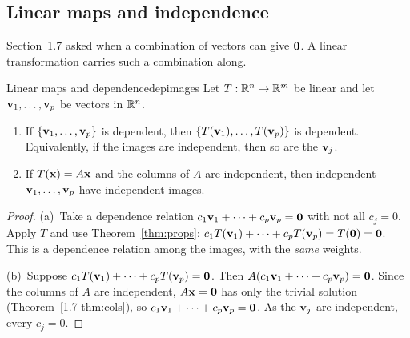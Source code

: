 \documentclass[11pt]{article}
\begin{document}
\subsection*{Linear maps and independence}

Section~1.7 asked when a combination of vectors can give $\mathbf{0}$. A linear transformation carries such a combination along.

\begin{thm}{Linear maps and dependence}{depimages}
Let $T:\mathbb{R}^n\to\mathbb{R}^m$ be linear and let $\mathbf{v}_1,\dots,\mathbf{v}_p$ be vectors in $\mathbb{R}^n$.
\begin{enumerate}[label=(\alph*),itemsep=1pt]
  \item If $\{\mathbf{v}_1,\dots,\mathbf{v}_p\}$ is dependent, then $\{T(\mathbf{v}_1),\dots,T(\mathbf{v}_p)\}$ is dependent. Equivalently, if the images are independent, then so are the $\mathbf{v}_j$.
  \item If $T(\mathbf{x})=A\mathbf{x}$ and the columns of $A$ are independent, then independent $\mathbf{v}_1,\dots,\mathbf{v}_p$ have independent images.
\end{enumerate}
\end{thm}

\begin{proof}
(a)~Take a dependence relation $c_1\mathbf{v}_1+\cdots+c_p\mathbf{v}_p=\mathbf{0}$ with not all $c_j=0$. Apply $T$ and use Theorem~\ref{thm:props}: $c_1T(\mathbf{v}_1)+\cdots+c_pT(\mathbf{v}_p)=T(\mathbf{0})=\mathbf{0}$. This is a dependence relation among the images, with the \emph{same} weights.

(b)~Suppose $c_1T(\mathbf{v}_1)+\cdots+c_pT(\mathbf{v}_p)=\mathbf{0}$. Then $A(c_1\mathbf{v}_1+\cdots+c_p\mathbf{v}_p)=\mathbf{0}$. Since the columns of $A$ are independent, $A\mathbf{x}=\mathbf{0}$ has only the trivial solution (Theorem~\ref{1.7-thm:cols}), so $c_1\mathbf{v}_1+\cdots+c_p\mathbf{v}_p=\mathbf{0}$. As the $\mathbf{v}_j$ are independent, every $c_j=0$.
\end{proof}
\end{document}
